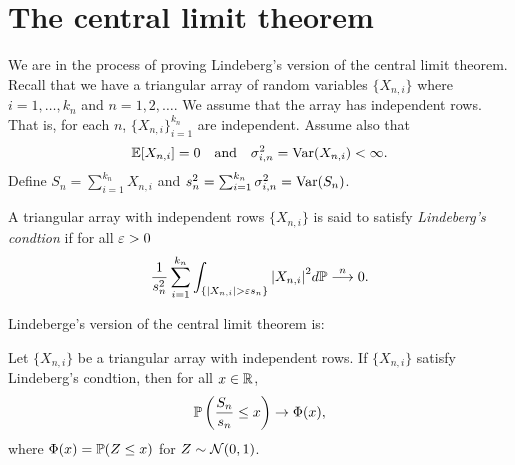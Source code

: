 \section{The central limit theorem}
We are in the process of proving Lindeberg's version of the central limit theorem. Recall that we have a triangular array of random variables $\{X_{n,i}\}$ where $i=1,\ldots, k_n$ and $n=1,2,\ldots$. We assume that the array has independent rows. That is, for each $n$, $\{X_{n,i}\}_{i=1}^{k_n}$ are independent. Assume also that 
\[{\mathbb{E}}[X_{n,i}]=0 ~~~\text{and}~~~\sigma_{i,n}^2 = \operatorname{Var}(X_{n,i})< \infty. \]
Define $S_n = \sum_{i=1}^{k_n}X_{n,i}$ and $s_n^2=\sum_{i=1}^{k_n} \sigma_{i,n}^2 = \operatorname{Var}(S_n)$. 
\begin{defn}
    A triangular array  with independent rows $\{X_{n,i}\}$ is said to satisfy \emph{Lindeberg's condtion} if for all $\varepsilon > 0$
    \[\frac{1}{s_n^2} \sum_{i=1}^{k_n} \int_{\{{\left\lvert X_{n,i}\right\rvert}>\varepsilon s_n\}}{\left\lvert X_{n,i}\right\rvert}^2d{\mathbb{P}} \stackrel{n}{\longrightarrow} 0. \]
\end{defn}
Lindeberge's version of the central limit theorem is:
\begin{thrm}[Lindeberg]
    Let $\{X_{n,i}\}$ be a triangular array with independent rows. If $\{X_{n,i}\}$ satisfy Lindeberg's condtion, then for all $x \in {\mathbb R}$,
    \[{\mathbb{P}}\left(\frac{S_n}{s_n} \le x\right) \to \Phi(x),\]
    where $\Phi(x) = {\mathbb{P}}(Z \le x)$ for $Z \sim {{\mathcal{N}}}(0,1)$.
\end{thrm}
